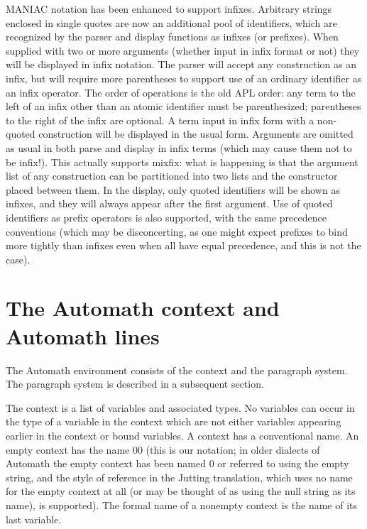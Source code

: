 \documentclass[12pt]{article}
\begin{document}
MANIAC notation has been enhanced to support infixes.  Arbitrary strings enclosed in single quotes are now an additional pool of identifiers, which are recognized by the parser and display functions as infixes (or prefixes).  When supplied with two or more arguments (whether input in infix format or not) they will be displayed in infix
notation.  The parser will accept any construction as an infix, but will require more parentheses to support use of an ordinary identifier as an infix operator.  The order of operations is the old APL order:  any term to the left of an infix other
than an atomic identifier must be parenthesized;  parentheses to the right of the infix are optional.  A term input in infix form with a non-quoted construction will be displayed in the usual form.  Arguments are omitted as usual  in both parse and display in infix terms (which may cause them not to be infix!).  This actually supports mixfix:  what is happening is that the argument list of any construction can be partitioned into two lists and the constructor placed between them.  In the display, only quoted identifiers
will be shown as infixes, and they will always appear after the first argument.   Use of quoted identifiers as prefix operators is also supported, with the same precedence conventions (which may be disconcerting, as one might expect prefixes to bind more tightly than infixes even when all have equal precedence, and this is not the case).

\newpage

\section{The Automath context and Automath lines}

The Automath environment consists of the context and the paragraph system.  The paragraph system is described in a subsequent section.

The context is a list of variables and associated types.  No variables can occur in the type of a variable in the context which are not either variables appearing earlier in the context
or bound variables.  A context has a conventional name.  An empty context has the name 00 (this is our notation;  in older dialects of Automath the empty context has been  named 0 or referred
to using the empty string, and the style of reference in the Jutting translation, which uses no name for the empty context at all (or may be thought of as using the null string as its name), is supported).  The formal name of a nonempty context is the name of its last variable.
\end{document}
